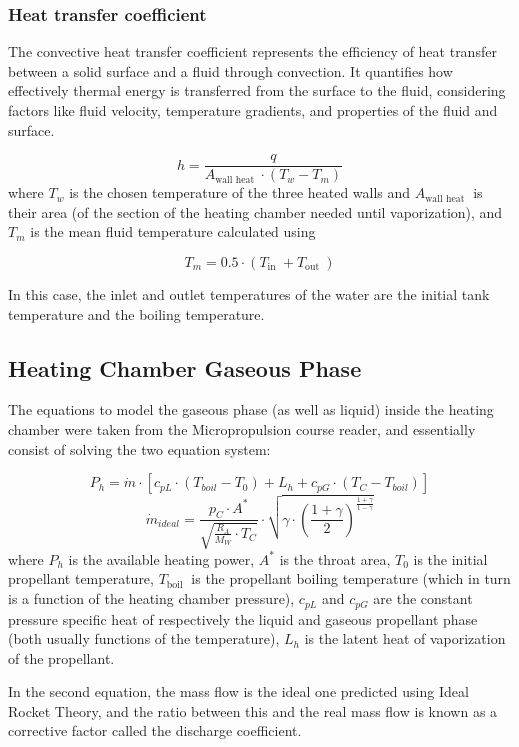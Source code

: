 \documentclass{homework}
\begin{document}
\begin{multicols}{2}
\subsubsection{Heat transfer coefficient}

    The convective heat transfer coefficient represents the efficiency of heat transfer between a solid surface and a fluid through convection. It quantifies how effectively thermal energy is transferred from the surface to the fluid, considering factors like fluid velocity, temperature gradients, and properties of the fluid and surface.
    
    $$
    h=\frac{q}{A_{\text {wall heat }} \cdot\left(T_w-T_m\right)}
    $$ 		    
    where $T_w$ is the chosen temperature of the three heated walls and $A_{\text {wall heat }}$ is their area (of the section of the heating chamber needed until vaporization), and $T_m$ is the mean fluid temperature calculated using   
    
    $$T_m=0.5 \cdot\left(T_{\text {in }}+T_{\text {out }}\right)$$ 
    
    In this case, the inlet and outlet temperatures of the water are the initial tank temperature and the boiling temperature. 
    
\subsection{Heating Chamber Gaseous Phase}

The equations to model the gaseous phase (as well as liquid) inside the heating chamber were taken from the Micropropulsion course reader, and essentially consist of solving the two equation system:
	    
$$
	  P_h=\dot{m} \cdot\left[c_{p L} \cdot\left(T_{b o i l}-T_0\right)+L_h+c_{p G} \cdot\left(T_C-T_{b o i l}\right)\right]
	  $$ 	    
$$
	  \dot{m}_{ideal} =\frac{p_C \cdot A^*}{\sqrt{\frac{R_A}{M_W} \cdot T_C}} \cdot \sqrt{\gamma \cdot\left(\frac{1+\gamma}{2}\right)^{\frac{1+\gamma}{1-\gamma}}}
	  $$ 	    
    where $P_h$ is the available heating power, $A^*$ is the throat area, $T_0$ is the initial propellant temperature, $T_{\text {boil }}$ is the propellant boiling temperature (which in turn is a function of the heating chamber pressure), $c_{p L}$ and $c_{p G}$ are the constant pressure specific heat of respectively the liquid and gaseous propellant phase (both usually functions of the temperature), $L_h$ is the latent heat of vaporization of the propellant.  

    In the second equation, the mass flow is the ideal one predicted using Ideal Rocket Theory, and the ratio between this and the real mass flow is known as a corrective factor called the discharge coefficient.


\end{multicols}
\end{document}
